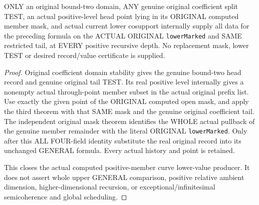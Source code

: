 \begin{theorem}
\label{hir:original-only-computed-positive-member-mask-full-values}
\leanok
ONLY an original bound-two domain, ANY genuine original coefficient split TEST,
an actual positive-level head point lying in its ORIGINAL computed member mask,
and actual current lower cosupport internally supply all data for the preceding
formula on the ACTUAL ORIGINAL \texttt{lowerMarked} and SAME restricted tail,
at EVERY positive recursive depth. No replacement mask, lower TEST or desired
record/value certificate is supplied.
\end{theorem}
\begin{proof}
Original coefficient domain stability gives the genuine bound-two head record
and genuine original tail TEST. Its real positive level internally gives a
nonempty actual through-point member subset in the actual original prefix list.
Use exactly the given point of the ORIGINAL computed open mask, and apply the
third theorem with that SAME mask and the genuine original coefficient tail.
The independent original mask theorem identifies the WHOLE actual pullback of
the genuine member remainder with the literal ORIGINAL \texttt{lowerMarked}.
Only after this ALL FOUR-field identity substitute the real original record
into its unchanged GENERAL formula. Every actual history and point is retained.

This closes the actual computed positive-member curve lower-value producer.
It does not assert whole upper GENERAL comparison, positive relative ambient
dimension, higher-dimensional recursion, or exceptional/infinitesimal
semicoherence and global scheduling.
\end{proof}
